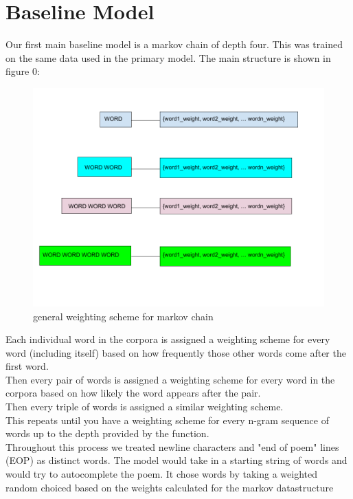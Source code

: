 \documentclass{article} %
\begin{document}
\section{Baseline Model}

Our first main baseline model is a markov chain of depth four. This was trained on the same data used in the primary model.
The main structure is shown in figure 0:

\begin{figure}[h]
  \begin{center}
  \includegraphics[width=1\textwidth]{Figs/MARKOV.png}
  \end{center}
  \caption{general weighting scheme for markov chain}
  \label{fig:plot}
  \end{figure}

Each individual word in the corpora is assigned a weighting scheme for every word (including itself) based on how frequently those other words come
after the first word.\\
Then every pair of words is assigned a weighting scheme for every word in the corpora based on how likely the word appears after the pair.\\
Then every triple of words is assigned a similar weighting scheme.\\
This repeats until you have a weighting scheme for every n-gram sequence of words up to the depth provided by the function.\\

Throughout this process we treated newline characters and "end of poem" lines (EOP) as distinct words. The model would take in a starting string of
words and would try to autocomplete the poem. It chose words by taking a weighted random choiced based on the weights calculated for the markov
datastructure\\
\end{document}
